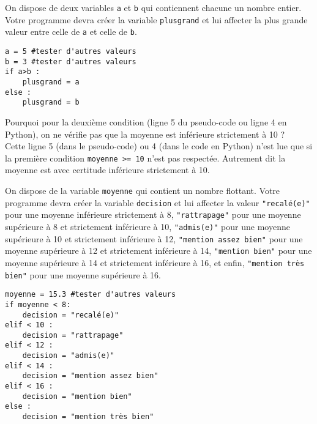 \newpage
\begin{cor}[Python]
\begin{multicols}{2}
On dispose de deux variables \texttt{a} et \texttt{b}  qui contiennent chacune un nombre entier. Votre programme devra créer la variable \texttt{plusgrand} et lui affecter la plus grande valeur entre celle de \texttt{a} et celle de \texttt{b}. 
\columnbreak
\begin{lstlisting}
a = 5 #tester d'autres valeurs
b = 3 #tester d'autres valeurs 
if a>b :
	plusgrand = a
else :
	plusgrand = b
\end{lstlisting}
\end{multicols}
\end{cor}

\begin{cor}
Pourquoi pour la deuxième condition (ligne 5 du pseudo-code ou ligne 4 en Python), on ne vérifie pas que la moyenne est inférieure strictement à 10 ?\\
Cette ligne 5 (dans le pseudo-code) ou 4 (dans le code en Python) n'est lue que si la première condition \texttt{moyenne >= 10} n'est pas respectée. Autrement dit la moyenne est avec certitude inférieure strictement à 10.
\end{cor}

\begin{cor}[Python]
\begin{multicols}{2}
On dispose de la variable \texttt{moyenne} qui contient un nombre flottant. Votre programme devra créer la variable \texttt{decision} et lui affecter la valeur \texttt{"recalé(e)"} pour une moyenne inférieure strictement à 8,  \texttt{"rattrapage"} pour une moyenne supérieure à 8 et strictement inférieure à 10, \texttt{"admis(e)"} pour une moyenne supérieure à 10 et strictement inférieure à 12, \texttt{"mention assez bien"} pour une moyenne supérieure à 12 et strictement inférieure à 14, \texttt{"mention bien"} pour une moyenne supérieure à 14 et strictement inférieure à 16, et enfin, \texttt{"mention très bien"} pour une moyenne supérieure à 16. 
\columnbreak
\begin{lstlisting}
moyenne = 15.3 #tester d'autres valeurs
if moyenne < 8:
	decision = "recalé(e)"
elif < 10 :
	decision = "rattrapage"
elif < 12 :
	decision = "admis(e)"
elif < 14 :
	decision = "mention assez bien"
elif < 16 :
	decision = "mention bien"
else :
	decision = "mention très bien"
\end{lstlisting}
\end{multicols}
\end{cor}

